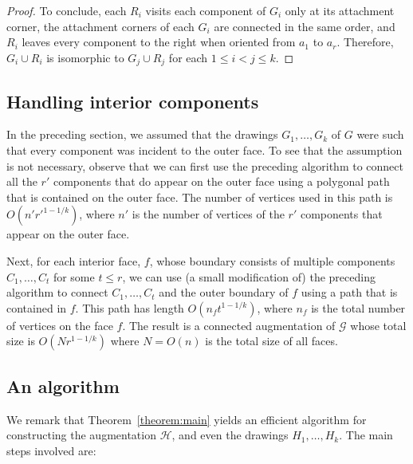 \documentclass[11pt]{patmorin}
\begin{document}
\begin{proof}
To conclude, each $R_i$ visits each component of $G_i$ only at its attachment corner, the attachment corners of each $G_i$ are connected in the same order, and $R_i$ leaves every component to the right when oriented from $a_1$ to $a_r$. Therefore, $G_i\cup R_i$ is isomorphic to $G_j\cup R_j$ for each $1\leq i<j\leq k$.
\end{proof}

\subsection{Handling interior components}\label{sec:Interior Components}

In the preceding section, we assumed that the drawings $G_1,\ldots,G_k$ of $G$ were such that every component was incident to the outer face.
To see that the assumption is not necessary, observe that we can first use the preceding algorithm to connect all the $r'$ components that do appear on the outer face using a polygonal path that is contained on the outer face.  The number of vertices used in this path is $O(n'r'^{1-1/k})$, where $n'$ is the number of vertices of the $r'$ components that appear on the outer face.

Next, for each interior face, $f$, whose boundary consists of multiple components
$C_1,\ldots,C_t$  for some $t\leq r$, we can use (a small modification of)
the preceding algorithm to connect $C_1,\ldots,C_t$ and the outer
boundary of $f$ using a path that is contained in $f$.  This path
has length $O(n_ft^{1-1/k})$, where $n_f$ is the total number of vertices on the face $f$.  
The result is a connected augmentation of $\mathcal G$ whose total size
is $O(Nr^{1-1/k})$ where $N=O(n)$ is the total size of all faces.

\subsection{An algorithm}


We remark that Theorem~\ref{theorem:main} yields an efficient algorithm for constructing the augmentation $\mathcal{H}$, and even the drawings $H_1,\ldots,H_k$.  The main steps involved are: 
\end{document}
